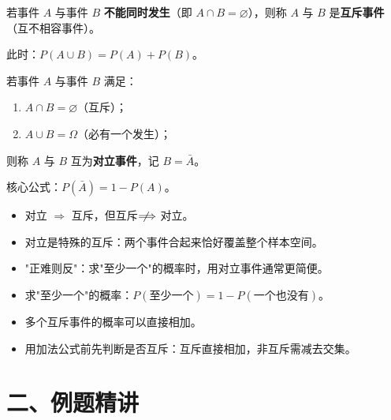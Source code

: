 \documentclass[12pt, a4paper]{ctexart}
\begin{document}
\begin{knowledgebox}[互斥事件]
若事件 $A$ 与事件 $B$ \textbf{不能同时发生}（即 $A \cap B = \varnothing$），则称 $A$ 与 $B$ 是\textbf{互斥事件}（互不相容事件）。

此时：$P(A \cup B) = P(A) + P(B)$。
\end{knowledgebox}

\begin{knowledgebox}[对立事件]
若事件 $A$ 与事件 $B$ 满足：
\begin{enumerate}[label=(\arabic*)]
  \item $A \cap B = \varnothing$（互斥）；
  \item $A \cup B = \Omega$（必有一个发生）；
\end{enumerate}
则称 $A$ 与 $B$ 互为\textbf{对立事件}，记 $B = \bar{A}$。

核心公式：$P(\bar{A}) = 1 - P(A)$。
\end{knowledgebox}

\begin{warnbox}[互斥与对立的关系]
\begin{itemize}
  \item 对立 $\Longrightarrow$ 互斥，但互斥 $\not\!\!\Longrightarrow$ 对立。
  \item 对立是特殊的互斥：两个事件合起来恰好覆盖整个样本空间。
  \item "正难则反"：求"至少一个"的概率时，用对立事件通常更简便。
\end{itemize}
\end{warnbox}

\begin{tipbox}[概率计算常用技巧]
\begin{itemize}
  \item 求"至少一个"的概率：$P(\text{至少一个}) = 1 - P(\text{一个也没有})$。
  \item 多个互斥事件的概率可以直接相加。
  \item 用加法公式前先判断是否互斥：互斥直接相加，非互斥需减去交集。
\end{itemize}
\end{tipbox}

\section*{\textcolor{examorange}{二、例题精讲}}
\end{document}
